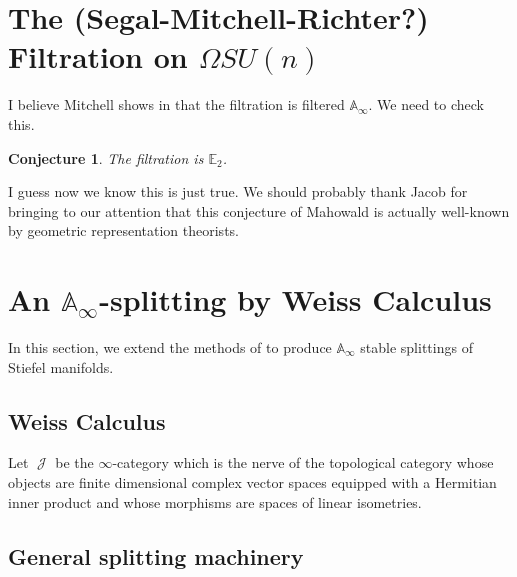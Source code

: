 \documentclass[oneside]{amsart}
\theoremstyle{definition}
\theoremstyle{plain}
\newtheorem{cnj}[nul]{Conjecture}
\DeclareMathOperator{\J}{\mathcal{J}}
\begin{document}
\section{The (Segal-Mitchell-Richter?) Filtration on \texorpdfstring{$\Omega SU(n)$}{Loops SU(n)}}

I believe Mitchell shows in \cite{MitchellSU(n)} that the filtration is filtered $\mathbb{A}_\infty$.  We need to check this.

\begin{cnj} The filtration is $\mathbb{E}_2$.
\end{cnj}
I guess now we know this is just true.  We should probably thank Jacob for bringing to our attention that this conjecture of Mahowald is actually well-known by geometric representation theorists.  

\section{An \texorpdfstring{$\mathbb{A}_\infty$}{Aoo}-splitting by Weiss Calculus}


In this section, we extend the methods of \cite{Arone} to produce $\mathbb{A}_\infty$ stable splittings of Stiefel manifolds.  
\subsection{Weiss Calculus}
Let $\J$ be the $\infty$-category which is the nerve of the topological category whose objects are finite dimensional complex vector spaces equipped with a Hermitian inner product and whose morphisms are spaces of linear isometries.  


\subsection{General splitting machinery}
\end{document}
